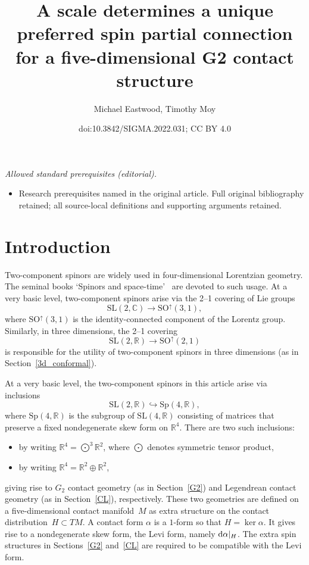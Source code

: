 \documentclass[10pt,a4paper]{amsart}
\title{A scale determines a unique preferred spin partial connection for a five-dimensional G2 contact structure}
\author{Michael Eastwood, Timothy Moy}
\date{doi:10.3842/SIGMA.2022.031; CC BY 4.0}
\numberwithin{equation}{section}
\begin{document}
\maketitle
\noindent\textit{Allowed standard prerequisites (editorial).}\begin{itemize}
\item Research prerequisites named in the original article. Full original bibliography retained; all source-local definitions and supporting arguments retained.
\end{itemize}\medskip
\section{Introduction}
Two-component spinors are widely used in four-dimensional Lorentzian geometry.
The seminal books `Spinors and space-time'~\cite{OT,NT} are devoted to such
usage. At a very basic level, two-component spinors arise via the 2--1 covering
of Lie groups
\[{\mathrm{SL}}(2,{\mathbb{C}})\longrightarrow{\mathrm{SO}}^\uparrow(3,1),\]
where ${\mathrm{SO}}^\uparrow(3,1)$ is the identity-connected component of the
Lorentz group. Similarly, in three dimensions, the 2--1 covering
\[{\mathrm{SL}}(2,{\mathbb{R}})\longrightarrow{\mathrm{SO}}^\uparrow(2,1)\]
is responsible for the utility of two-component spinors in three dimensions
(as in Section~\ref{3d_conformal}).

At a very basic level, the two-component spinors in this article arise via
inclusions
\[{\mathrm{SL}}(2,{\mathbb{R}})\hookrightarrow{\mathrm{Sp}}(4,{\mathbb{R}}),\]
where ${\mathrm{Sp}}(4,{\mathbb{R}})$ is the subgroup of
${\mathrm{SL}}(4,{\mathbb{R}})$ consisting of matrices that preserve a fixed
non\-degenerate skew form on ${\mathbb{R}}^4$. There are two such inclusions:
\begin{itemize}\itemsep=0pt
\item by writing ${\mathbb{R}}^4=\bigodot^3{\mathbb{R}}^2$, where $\bigodot$
denotes symmetric tensor product,
\item by writing ${\mathbb{R}}^4={\mathbb{R}}^2\oplus{\mathbb{R}}^2$,
\end{itemize}
giving rise to $G_2$ contact geometry (as in Section~\ref{G2}) and Legendrean
contact geometry (as in Section~\ref{CL}), respectively. These two geometries are
defined on a five-dimensional contact mani\-fold~$M$ as extra structure on the
contact distribution~$H\subset TM$. A contact form $\alpha$ is a $1$-form so
that $H=\ker\alpha$. It gives rise to a nondegenerate skew form, the Levi
form, namely ${\rm d}\alpha|_H$. The extra spin structures in Sections~\ref{G2} and~\ref{CL} are required to be compatible with the Levi form.
\end{document}

